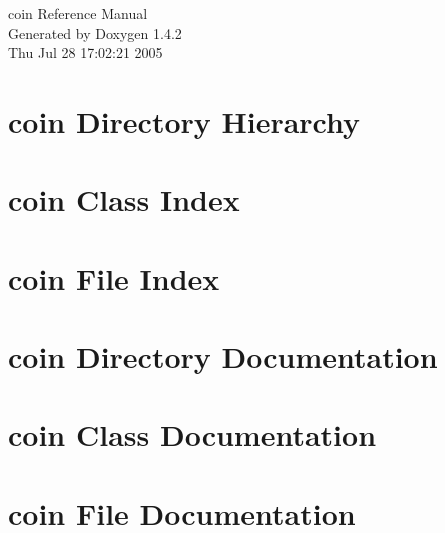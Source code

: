 \documentclass[a4paper]{book}
\begin{document}
\begin{titlepage}
\vspace*{7cm}
\begin{center}
{\Large coin Reference Manual}\\
\vspace*{1cm}
{\large Generated by Doxygen 1.4.2}\\
\vspace*{0.5cm}
{\small Thu Jul 28 17:02:21 2005}\\
\end{center}
\end{titlepage}
\clearemptydoublepage
{}
\tableofcontents
\clearemptydoublepage
{}
\chapter{coin Directory Hierarchy}

\chapter{coin Class Index}

\chapter{coin File Index}

\chapter{coin Directory Documentation}

\chapter{coin Class Documentation}

\chapter{coin File Documentation}









\printindex
\end{document}
